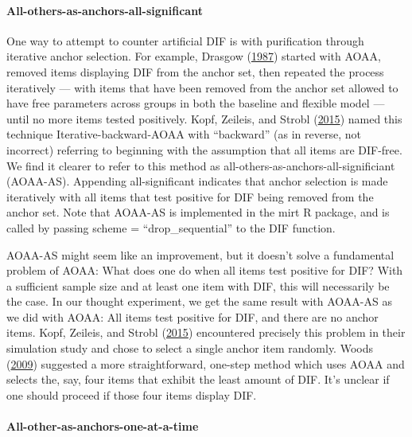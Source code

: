 \documentclass[
  11pt,
]{article}
\begin{document}
\hypertarget{all-others-as-anchors-all-significant}{%
\paragraph{All-others-as-anchors-all-significant}\label{all-others-as-anchors-all-significant}}

One way to attempt to counter artificial DIF is with purification through iterative anchor selection. For example, Drasgow (\protect\hyperlink{ref-drasgow1987study}{1987}) started with AOAA, removed items displaying DIF from the anchor set, then repeated the process iteratively --- with items that have been removed from the anchor set allowed to have free parameters across groups in both the baseline and flexible model --- until no more items tested positively. Kopf, Zeileis, and Strobl (\protect\hyperlink{ref-kopf2015framework}{2015}) named this technique Iterative-backward-AOAA with \enquote{backward} (as in reverse, not incorrect) referring to beginning with the assumption that all items are DIF-free. We find it clearer to refer to this method as all-others-as-anchors-all-significiant (AOAA-AS). Appending all-significant indicates that anchor selection is made iteratively with all items that test positive for DIF being removed from the anchor set. Note that AOAA-AS is implemented in the mirt R package, and is called by passing scheme = \enquote{drop\_sequential} to the DIF function.

AOAA-AS might seem like an improvement, but it doesn't solve a fundamental problem of AOAA: What does one do when all items test positive for DIF? With a sufficient sample size and at least one item with DIF, this will necessarily be the case. In our thought experiment, we get the same result with AOAA-AS as we did with AOAA: All items test positive for DIF, and there are no anchor items. Kopf, Zeileis, and Strobl (\protect\hyperlink{ref-kopf2015framework}{2015}) encountered precisely this problem in their simulation study and chose to select a single anchor item randomly. Woods (\protect\hyperlink{ref-woods2009empirical}{2009}) suggested a more straightforward, one-step method which uses AOAA and selects the, say, four items that exhibit the least amount of DIF. It's unclear if one should proceed if those four items display DIF.

\hypertarget{all-other-as-anchors-one-at-a-time}{%
\paragraph{All-other-as-anchors-one-at-a-time}\label{all-other-as-anchors-one-at-a-time}}
\end{document}
